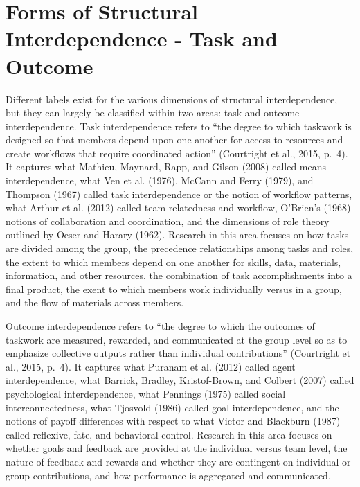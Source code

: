 \documentclass[english,,man]{apa6}
\theoremstyle{definition}
\theoremstyle{definition}
\theoremstyle{definition}
\theoremstyle{remark}
\begin{document}
\hypertarget{forms-of-structural-interdependence---task-and-outcome}{%
\section{Forms of Structural Interdependence - Task and
Outcome}\label{forms-of-structural-interdependence---task-and-outcome}}

Different labels exist for the various dimensions of structural
interdependence, but they can largely be classified within two areas:
task and outcome interdependence. Task interdependence refers to
\enquote{the degree to which taskwork is designed so that members depend
upon one another for access to resources and create workflows that
require coordinated action} (Courtright et al., 2015, p.~4). It captures
what Mathieu, Maynard, Rapp, and Gilson (2008) called means
interdependence, what Ven et al. (1976), McCann and Ferry (1979), and
Thompson (1967) called task interdependence or the notion of workflow
patterns, what Arthur et al. (2012) called team relatedness and
workflow, O'Brien's (1968) notions of collaboration and coordination,
and the dimensions of role theory outlined by Oeser and Harary (1962).
Research in this area focuses on how tasks are divided among the group,
the precedence relationships among tasks and roles, the extent to which
members depend on one another for skills, data, materials, information,
and other resources, the combination of task accomplishments into a
final product, the exent to which members work individually versus in a
group, and the flow of materials across members.

Outcome interdependence refers to \enquote{the degree to which the
outcomes of taskwork are measured, rewarded, and communicated at the
group level so as to emphasize collective outputs rather than individual
contributions} (Courtright et al., 2015, p.~4). It captures what Puranam
et al. (2012) called agent interdependence, what Barrick, Bradley,
Kristof-Brown, and Colbert (2007) called psychological interdependence,
what Pennings (1975) called social interconnectedness, what Tjosvold
(1986) called goal interdependence, and the notions of payoff
differences with respect to what Victor and Blackburn (1987) called
reflexive, fate, and behavioral control. Research in this area focuses
on whether goals and feedback are provided at the individual versus team
level, the nature of feedback and rewards and whether they are
contingent on individual or group contributions, and how performance is
aggregated and communicated.
\end{document}
